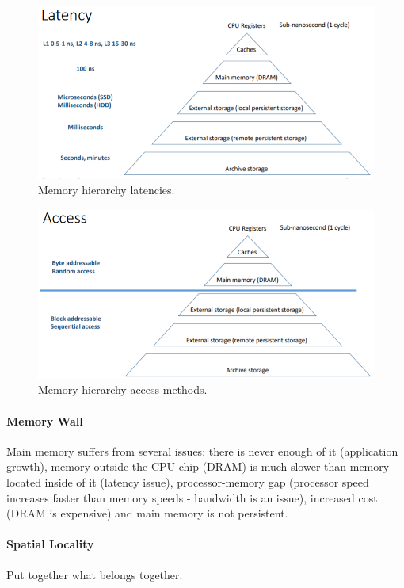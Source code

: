 \begin{figure}[h]
	\centering
	\includegraphics[scale=0.5]{images/1-lat.PNG}
	\caption{Memory hierarchy latencies.}
	\label{fig:lat}
\end{figure}

\begin{figure}[h]
	\centering
	\includegraphics[scale=0.5]{images/1-acc.PNG}
	\caption{Memory hierarchy access methods.}
	\label{fig:acc}
\end{figure}

\paragraph{Memory Wall}
Main memory suffers from several issues: there is never enough of it (application growth), memory outside the CPU chip (DRAM) is much slower than memory located inside of it (latency issue), processor-memory gap (processor speed increases faster than memory speeds - bandwidth is an issue), increased cost (DRAM is expensive) and main memory is not persistent.

\paragraph{Spatial Locality}
Put together what belongs together.


